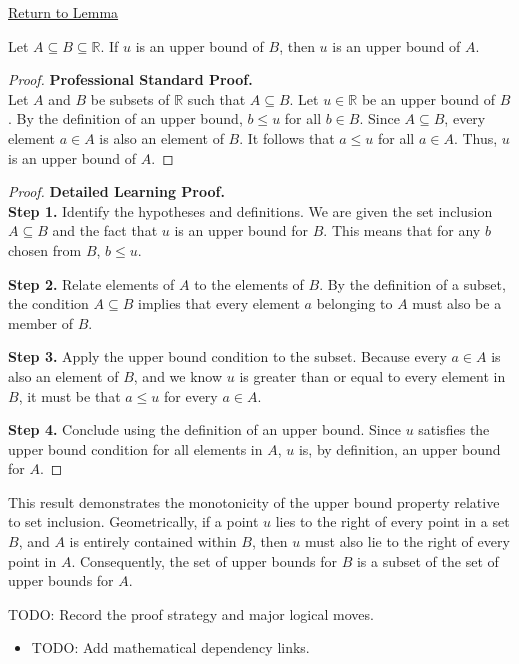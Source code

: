 \newpage
{}
\label{prf:subset-inclusion-preserves-upper-bounds}

\begin{remark*}[Return]
\hyperref[lem:subset-inclusion-preserves-upper-bounds]{Return to Lemma}
\end{remark*}

\begin{theorem*}
Let $A \subseteq B \subseteq \mathbb{R}$. If $u$ is an upper bound of $B$, then $u$ is an upper bound of $A$.
\end{theorem*}

\begin{proof}

\textbf{Professional Standard Proof.}~\\
Let $A$ and $B$ be subsets of $\mathbb{R}$ such that $A \subseteq B$. Let $u \in \mathbb{R}$ be an upper bound of $B$. By the definition of an upper bound, $b \le u$ for all $b \in B$. Since $A \subseteq B$, every element $a \in A$ is also an element of $B$. It follows that $a \le u$ for all $a \in A$. Thus, $u$ is an upper bound of $A$.
\end{proof}

\begin{proof}

\textbf{Detailed Learning Proof.}~\\
\textbf{Step 1.} Identify the hypotheses and definitions.
We are given the set inclusion $A \subseteq B$ and the fact that $u$ is an upper bound for $B$. This means that for any $b$ chosen from $B$, $b \le u$.

\textbf{Step 2.} Relate elements of $A$ to the elements of $B$.
By the definition of a subset, the condition $A \subseteq B$ implies that every element $a$ belonging to $A$ must also be a member of $B$.

\textbf{Step 3.} Apply the upper bound condition to the subset.
Because every $a \in A$ is also an element of $B$, and we know $u$ is greater than or equal to every element in $B$, it must be that $a \le u$ for every $a \in A$.

\textbf{Step 4.} Conclude using the definition of an upper bound.
Since $u$ satisfies the upper bound condition for all elements in $A$, $u$ is, by definition, an upper bound for $A$.
\end{proof}

\begin{remark*}[Interpretation]
This result demonstrates the monotonicity of the upper bound property relative to set inclusion. Geometrically, if a point $u$ lies to the right of every point in a set $B$, and $A$ is entirely contained within $B$, then $u$ must also lie to the right of every point in $A$. Consequently, the set of upper bounds for $B$ is a subset of the set of upper bounds for $A$.
\end{remark*}

\begin{remark*}
TODO: Record the proof strategy and major logical moves.
\end{remark*}

\begin{dependencies}
\begin{itemize}
  \item TODO: Add mathematical dependency links.
\end{itemize}
\end{dependencies}
